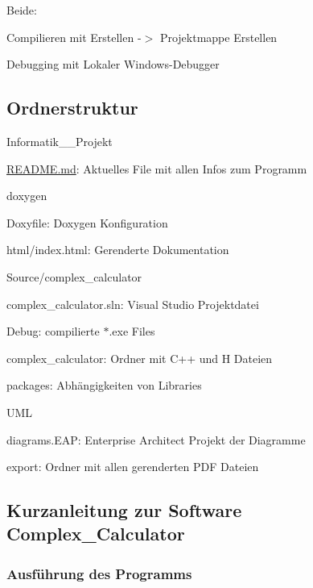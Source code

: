 Beide\+:
\begin{DoxyItemize}
\item Compilieren mit {\ttfamily Erstellen -\/$>$ Projektmappe Erstellen}
\item Debugging mit {\ttfamily Lokaler Windows-\/\+Debugger}
\end{DoxyItemize}

\subsection*{Ordnerstruktur}

Informatik\+\_\+\_\+\+Projekt
\begin{DoxyItemize}
\item \mbox{\hyperlink{_r_e_a_d_m_e_8md}{R\+E\+A\+D\+M\+E.\+md}}\+: Aktuelles File mit allen Infos zum Programm
\item doxygen
\begin{DoxyItemize}
\item Doxyfile\+: Doxygen Konfiguration
\item html/index.\+html\+: Gerenderte Dokumentation
\end{DoxyItemize}
\item Source/complex\+\_\+calculator
\begin{DoxyItemize}
\item complex\+\_\+calculator.\+sln\+: Visual Studio Projektdatei
\item Debug\+: compilierte $\ast$.exe Files
\item complex\+\_\+calculator\+: Ordner mit C++ und H Dateien
\item packages\+: Abhängigkeiten von Libraries
\end{DoxyItemize}
\item U\+ML
\begin{DoxyItemize}
\item diagrams.\+E\+AP\+: Enterprise Architect Projekt der Diagramme
\item export\+: Ordner mit allen gerenderten P\+DF Dateien
\end{DoxyItemize}
\end{DoxyItemize}

\subsection*{Kurzanleitung zur Software Complex\+\_\+\+Calculator}

\subsubsection*{Ausführung des Programms}

